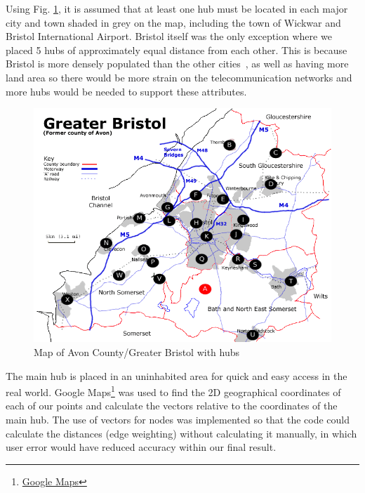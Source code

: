 \documentclass[twocolumn]{article}
\begin{document}
Using Fig. \ref{fig:avon}, it is assumed that at least one hub must be located in each major city and town shaded in grey on the map, including the town of Wickwar and Bristol International Airport. Bristol itself was the only exception where we placed 5 hubs of approximately equal distance from each other. This is because Bristol is more densely populated than the other cities~\cite{PopuationDensityRankings}, as well as having more land area so there would be more strain on the telecommunication networks and more hubs would be needed to support these attributes.


\begin{figure}[H]
\centering
\includegraphics[width=1.0\columnwidth]{Figures/Bristol Superimposed.png}
\caption{Map of Avon County/Greater Bristol with hubs}
\label{fig:avon}
\end{figure}

The main hub is placed in an uninhabited area for quick and easy access in the real world. Google Maps\footnote{\href{https://www.google.co.uk/maps}{Google Maps}} was used to find the 2D geographical coordinates of each of our points and calculate the vectors relative to the coordinates of the main hub. The use of vectors for nodes was implemented so that the code could calculate the distances (edge weighting) without calculating it manually, in which user error would have reduced accuracy within our final result.
\end{document}
